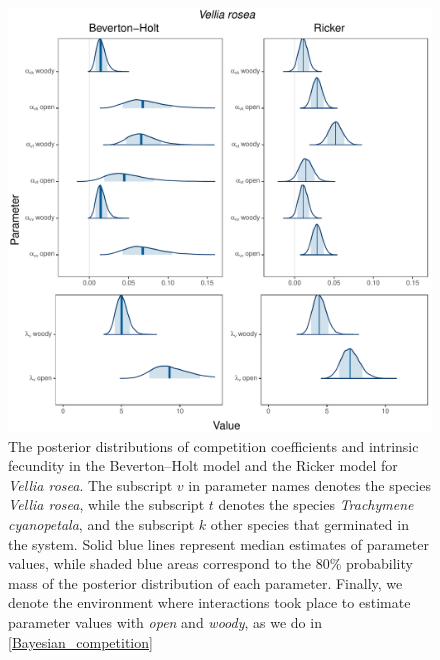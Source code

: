 \begin{refsection}
\begin{figure}[H]
  \centerline{\includegraphics[width=1\textwidth]{figures/appendixB_fig1}}
  \caption[The posterior distributions of competition coefficients and intrinsic fecundity in the Beverton--Holt model and the Ricker model for \textit{Vellia rosea}.]{The posterior distributions of competition coefficients and intrinsic fecundity in the Beverton--Holt model and the Ricker model for \textit{Vellia rosea}. The subscript $v$ in parameter names denotes the species \textit{Vellia rosea}, while the subscript $t$ denotes the species \textit{Trachymene cyanopetala}, and the subscript $k$ other species that germinated in the system. Solid blue lines represent median estimates of parameter values, while shaded blue areas correspond to the 80\% probability mass of the posterior distribution of each parameter. Finally, we denote the environment where interactions took place to estimate parameter values with \textit{open} and \textit{woody}, as we do in \autoref{Bayesian_competition} }
  \label{fig:vero_dist}
\end{figure}

\clearpage


\end{refsection}
